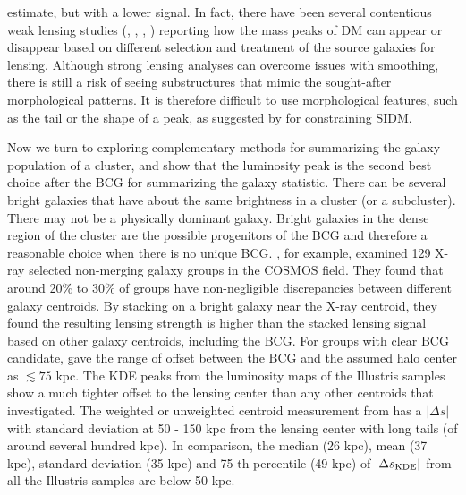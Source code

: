 estimate, but with a lower signal. 
In fact, there have been several contentious weak lensing studies (\citealt{Clowe2012},
\citealt{Jee2014b}, \citealt{Wittman2014}, \citealt{Cook2012})
reporting how the mass peaks of DM can appear or disappear based on
different selection and treatment of the source galaxies for lensing. 
Although strong lensing analyses can overcome issues with smoothing, 
there is still a risk of seeing substructures that mimic the sought-after 
morphological patterns. 
It is therefore difficult to use morphological features, such as the tail or the shape 
of a peak,
as suggested by \cite{Kahlhoefer14} for constraining SIDM.

Now we turn to exploring complementary methods for summarizing
the galaxy population of a cluster, and show that  the luminosity peak 
is the second best choice after the BCG for summarizing the galaxy statistic.
There can be several bright galaxies that have about the same brightness 
in a cluster (or a subcluster). There may not be a physically dominant galaxy.  
Bright galaxies in the dense region of the cluster are the possible progenitors 
of the BCG and therefore a reasonable choice when there is no unique BCG. 
\cite{George2012a}, for example, examined 129 X-ray selected non-merging galaxy 
groups in the COSMOS field.
They found that around 20\% to 30\% of groups have non-negligible discrepancies
between different galaxy centroids. 
By stacking on a bright galaxy near the X-ray centroid, they found  
the resulting lensing strength is higher than the stacked lensing signal based
on other galaxy centroids, including the BCG. 
For groups with clear BCG candidate, \cite{George2012a} gave the range of
offset between the BCG and the assumed halo center as $\lesssim 75$ kpc. 
The KDE peaks from the luminosity maps of the Illustris samples show a much 
tighter offset to the 
lensing center than any other centroids that \cite{George2012a} investigated. 
The weighted or unweighted centroid measurement from \cite{George2012a} has a 
$|\Delta s|$ with standard deviation at 50 - 150 kpc from the
lensing center with long tails (of around several hundred kpc). 
In comparison, the median (26 kpc), mean (37 kpc), standard deviation (35 kpc) 
and 75-th percentile (49 kpc) of 
$|\Delta s_{\rm KDE}|$ from all the Illustris samples are below 50 kpc. 

